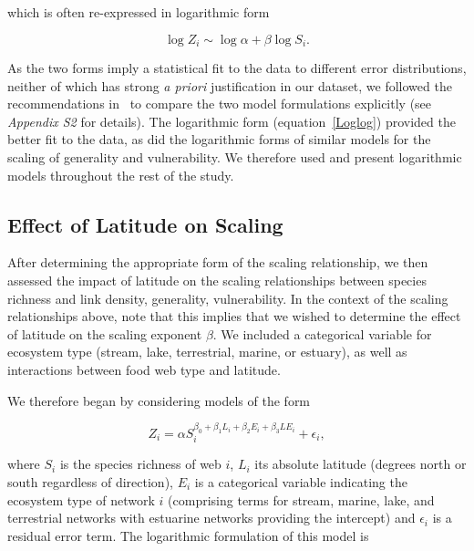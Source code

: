 \documentclass[12pt]{article}
\begin{document}
    \noindent which is often re-expressed in logarithmic form 

    \begin{equation}
    \label{Loglog}
    \log{Z_{i}} \sim \log{\alpha} + \beta\log{S_{i}}  .
    \end{equation}

    \noindent As the two forms imply a statistical fit to the data to different error 
    distributions, neither of which has strong
    \emph{a priori} justification in our dataset, we followed the recommendations in~\cite{Xiao2011}
    to compare the two model formulations explicitly (see \emph{Appendix S2} for details). 
    The logarithmic form (equation~\ref{Loglog}) provided the better fit to the data,
    as did the logarithmic forms of similar models for the scaling of generality and vulnerability. 
    We therefore used and present logarithmic models throughout the rest of the study.


  \subsection*{Effect of Latitude on Scaling}


    After determining the appropriate form of the scaling relationship, we
    then assessed the impact of latitude on the scaling relationships between
    species richness and link density, generality, vulnerability. In the
    context of the scaling relationships above, note  that this implies that
    we wished to determine the effect of latitude on the scaling exponent
    $\beta$. We included a categorical variable for
    ecosystem type (stream, lake,  terrestrial, marine, or estuary), as well
    as interactions between food web type and latitude.


    We therefore began by considering models of the form

    \begin{equation}
    \label{PowerLat}
    Z_{i}=\alpha S_{i}^{\beta_{0}+\beta_{1}L_{i}+\beta_{2}E_{i}+\beta_{3}LE_{i}} + \epsilon_{i} ,
    \end{equation}

    \noindent where $S_{i}$ is the species richness of web $i$, $L_{i}$ its absolute
    latitude (degrees north or south  regardless of direction), $E_{i}$ is a categorical
    variable indicating the ecosystem type of network $i$ (comprising terms for stream, 
    marine, lake, and terrestrial networks with estuarine
    networks providing the intercept) and $\epsilon_{i}$ is a residual error term.
    The logarithmic formulation of this model is
\end{document}
